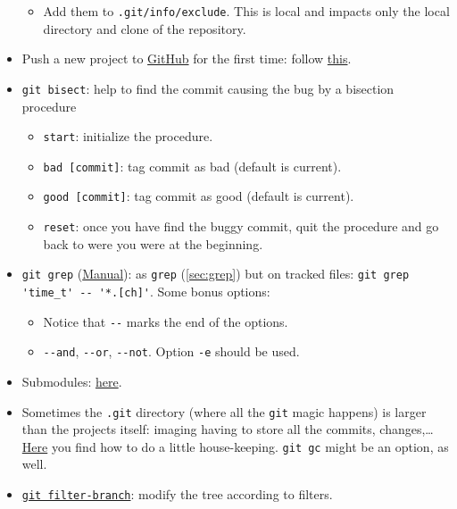\documentclass[a4paper,12pt,%
              final%
              ]{article}
\begin{document}
\begin{itemize}
\begin{itemize}
      \item Add them to \texttt{.git/info/exclude}. This is local and impacts only the local directory and clone of the repository.
    \end{itemize}
  \item Push a new project to \href{https://github.com/}{GitHub} for the first time: follow \href{https://help.github.com/en/github/importing-your-projects-to-github/adding-an-existing-project-to-github-using-the-command-line}{this}.
  \item \texttt{git bisect}: help to find the commit causing the bug by a bisection procedure
    \begin{itemize}
      \item \verb|start|: initialize the procedure.
      \item \verb|bad [commit]|: tag commit as bad (default is current).
      \item \verb|good [commit]|: tag commit as good (default is current).
      \item \verb|reset|: once you have find the buggy commit, quit the procedure and go back to were you were at the beginning.
    \end{itemize}
  \item \verb|git grep| (\href{https://git-scm.com/docs/git-grep}{Manual}): as \verb|grep| (\autoref{sec:grep}) but on tracked files: \verb|git grep 'time_t' -- '*.[ch]'|. Some bonus options:
    \begin{itemize}
      \item Notice that \verb|--| marks the end of the options.
      \item \verb|--and|, \verb|--or|, \verb|--not|. Option \verb|-e| should be used.
    \end{itemize}
  \item Submodules: \href{https://git-scm.com/book/en/v2/Git-Tools-Submodules}{here}.
  \item Sometimes the \texttt{.git} directory (where all the \texttt{git} magic happens) is larger than the projects itself: imaging having to store all the commits, changes,\ldots{} \href{https://stackoverflow.com/questions/5277467/how-can-i-clean-my-git-folder-cleaned-up-my-project-directory-but-git-is-sti}{Here} you find how to do a little house-keeping. \verb|git gc| might be an option, as well.
  \item \href{https://git-scm.com/docs/git-filter-branch}{\texttt{git filter-branch}}: modify the tree according to filters.

\end{itemize}
\end{document}

